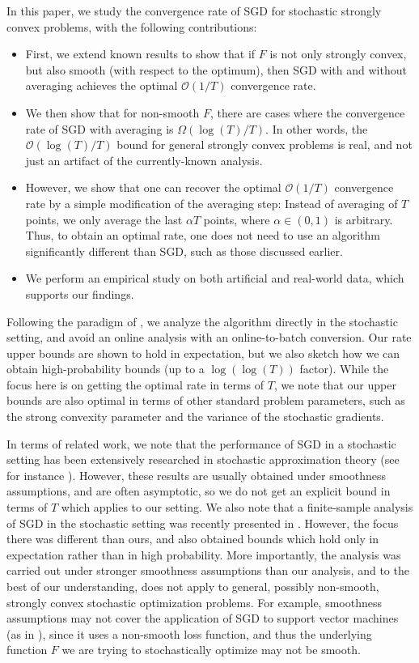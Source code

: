 \documentclass{article}
\newcommand{\Ocal}{\mathcal{O}}
\begin{document}
In this paper, we study the convergence rate of SGD for stochastic strongly convex problems, with the following contributions:
\begin{itemize}
    \item First, we extend known results to show that if $F$ is not only strongly convex, but also smooth (with respect to the optimum), then SGD with and without averaging achieves the optimal $\Ocal(1/T)$ convergence rate.
    \item We then show that for non-smooth $F$, there are cases where the convergence rate of SGD with averaging is $\Omega(\log(T)/T)$. In other words, the $\Ocal(\log(T)/T)$ bound for general strongly convex problems is real, and not just an artifact of the currently-known analysis.
    \item However, we show that one can recover the optimal $\Ocal(1/T)$ convergence rate by a simple modification of the averaging step: Instead of averaging of $T$ points, we only average the last $\alpha T$ points, where $\alpha\in (0,1)$ is arbitrary. Thus, to obtain an optimal rate, one does not need to use an algorithm significantly different than SGD, such as those discussed earlier.
    \item We perform an empirical study on both artificial and real-world data, which supports our findings.
\end{itemize}
Following the paradigm of \cite{HazanKa11}, we analyze the algorithm directly in the stochastic setting, and avoid an online analysis with an online-to-batch conversion. Our rate upper bounds are shown to hold in expectation, but we also sketch how we can obtain high-probability bounds (up to a $\log(\log(T))$ factor). While the focus here is on getting the optimal rate in terms of $T$, we note that our upper bounds are also optimal in terms of other standard problem parameters, such as the strong convexity parameter and the variance of the stochastic gradients.

In terms of related work, we note that the performance of SGD in a stochastic setting has been extensively researched in stochastic approximation theory (see for instance \cite{KushnerYin03}). However, these results are usually obtained under smoothness assumptions, and are often asymptotic, so we do not get an explicit bound in terms of $T$ which applies to our setting. We also note that a finite-sample analysis of SGD in the stochastic setting was recently presented in \cite{BachMoulines11}. However, the focus there was different than ours, and also obtained bounds which hold only in expectation rather than in high probability. More importantly, the analysis was carried out under stronger smoothness assumptions than our analysis, and to the best of our understanding, does not apply to general, possibly non-smooth, strongly convex stochastic optimization problems. For example, smoothness assumptions may not cover the application of SGD to support vector machines (as in \cite{ShaSiSreCo11}), since it uses a non-smooth loss function, and thus the underlying function $F$ we are trying to stochastically optimize may not be smooth.
\end{document}
